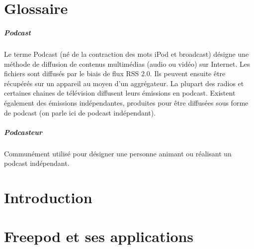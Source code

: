 \documentclass[11pt, french]{report}
\begin{document}



\tableofcontents



     								
\chapter*{Glossaire}

\paragraph{Podcast}

Le terme Podcast (né de la contraction des mots iPod et broadcast) désigne une méthode de diffusion de contenus multimédias (audio ou vidéo) sur Internet. Les fichiers sont diffusés par le biais de flux RSS 2.0. Ils peuvent ensuite être récupérés sur un appareil au moyen d’un aggrégateur.
La plupart des radios et certaines chaines de télévision diffusent leurs émissions en podcast. Existent également des émissions indépendantes, produites pour être diffusées sous forme de podcast (on parle ici de podcast indépendant).

\paragraph{Podcasteur}

Communément utilisé pour désigner une personne animant ou réalisant un podcast indépendant.

     								
\chapter*{Introduction}


\chapter{Freepod et ses applications}
\end{document}
